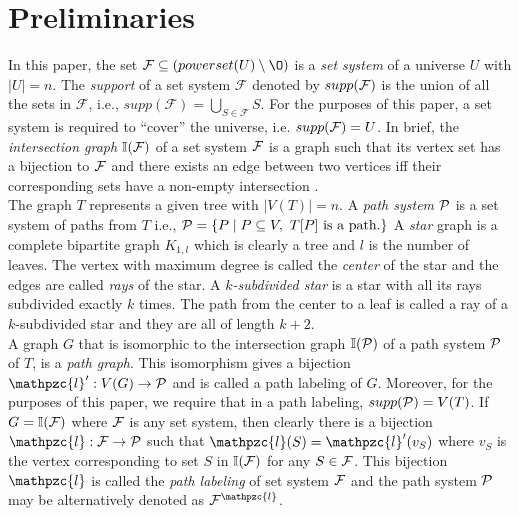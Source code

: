 \documentclass{fsttcs}
\def\cF{{\cal F}}
\def\cP{{\cal P}}
\def\F{{\mathcal F}}
\def\bI{\mathbb I}
\def\cl{\mathpzc{l}}
\begin{document}
\section{Preliminaries} \label{sec:prelims} 
\noindent
In this paper, the set $\F \subseteq (powerset(U) \setminus \O)$ is a
{\em set system} of a universe $U$ with $|U| = n$. 
The {\em support} of a set system $\F$ denoted by  $supp(\cF)$ is the
union of all the sets in $\F$, i.e., $supp(\F) =
\bigcup_{S \in \F}S$.
For the purposes of this paper, a set system is required to ``cover'' the universe,
i.e. $ supp(\cF) = U$. In brief, the {\em intersection graph} $\bI(\cF)$ of a
set system $\cF$ is a graph such that its vertex set has a bijection
to $\cF$ and there exists an edge between two vertices iff their
corresponding sets have a non-empty
intersection \cite{mcg04}. \\
\noindent
The graph $T$ represents a given tree with $|V(T)| = n$. 
A {\em path system} $\cP$ is a set system of paths from
$T$ i.e., $\cP = \{P \mid P \subseteq V, \text{ } T[P]
\text{ is a path.} \}$
\noindent
A {\em star} graph is a complete bipartite graph
$K_{1,l}$ which is clearly a tree and $l$ is the number of leaves. The vertex with maximum degree is called the {\em center} of
the star and the edges are called {\em rays} of the star.
A {\em $k$-subdivided star} is a star with all its rays subdivided exactly
$k$ times. The path from the center to a leaf is called a ray of a
$k$-subdivided star and they are all of length $k+2$.\\
\noindent
A graph $G$ that is isomorphic to the intersection graph $\bI(\cP)$ of a
path system $\cP$ of $T$, is a {\em path graph}. This
isomorphism gives a bijection $\cl': V(G) \rightarrow \cP$ and is
called a path labeling of $G$. Moreover, for the purposes of this paper, we
require that in a path labeling, $supp(\cP) = V(T)$. 
If $G = \bI(\cF)$ where $\cF$ is any set system, then clearly there is
a bijection $\cl: \cF \rightarrow \cP$ such that $\cl(S) = \cl'(v_S)$
where $v_S$ is the vertex corresponding to set $S$ in $\bI(\cF)$ for
any $S \in \cF$. 
This bijection $\cl$ is called the {\em path labeling} of set system
$\cF$ and the path system $\cP$ may be alternatively denoted as
$\cF^\cl$. 
 
\end{document}
